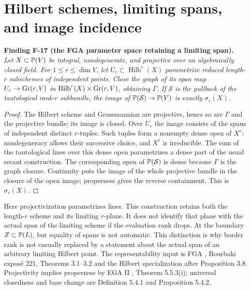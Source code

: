 \documentclass[11pt]{article}
\newcommand{\Hilb}{\operatorname{Hilb}}\newcommand{\coker}{\operatorname{coker}}
\newenvironment{finding}[2]{\par\medskip\noindent\textbf{Finding #1 (#2).}\ \itshape}{\par\medskip}
\begin{document}
\section{Hilbert schemes, limiting spans, and image incidence}
\begin{finding}{F-17}{the FGA parameter space retaining a limiting span}
Let $X\subset\mathbb P(V)$ be integral, nondegenerate, and projective
over an algebraically closed field. For $1\leq r\leq\dim V$,
let $U_r\subset\Hilb^r(X)$ parametrize reduced length-$r$
subschemes of independent points. Close the graph of its span map
$U_r\to\operatorname{Gr}(r,V)$ in $\Hilb^r(X)\times\Gr(r,V)$, obtaining $\Gamma$.
If $\mathcal S$ is the pullback of the tautological rank-$r$
subbundle, the image of
$\mathbb P(\mathcal S)\to\mathbb P(V)$ is exactly $\sigma_r(X)$.
\end{finding}
\begin{proof}
The Hilbert scheme and Grassmannian are projective, hence so
are $\Gamma$ and the projective bundle; its image is closed.
Over $U_r$ the image consists of the spans of independent
distinct $r$-tuples. Such tuples form a nonempty dense open
of $X^r$: nondegeneracy allows their successive choice, and
$X^r$ is irreducible. The sum of the tautological lines over
this dense open parametrizes a dense part of the usual secant
construction. The corresponding open of $\mathbb P(\mathcal S)$
is dense because $\Gamma$ is the graph closure.
Continuity puts the image of the whole projective bundle in
the closure of the open image; properness gives the reverse
containment. This is $\sigma_r(X)$.
\end{proof}
Here projectivization parametrizes lines. This construction
retains both the length-$r$ scheme and its limiting $r$-plane.
It does not identify that plane with the actual span of the
limiting scheme if the evaluation rank drops. At the boundary
$Z\subset\mathbb P(L)$, but equality of spans is not automatic.
This distinction is why border rank is not casually replaced
by a statement about the actual span of an arbitrary limiting
Hilbert point. The representability input is FGA \cite{FGA},
Bourbaki expos\'e 221, Theorems 3.1--3.2 and the Hilbert
specialization after Proposition 3.8.
Projectivity implies properness by EGA II \cite{EGA2},
Theorem 5.5.3(i); universal closedness and base change are
Definition 5.4.1 and Proposition 5.4.2.
\end{document}
